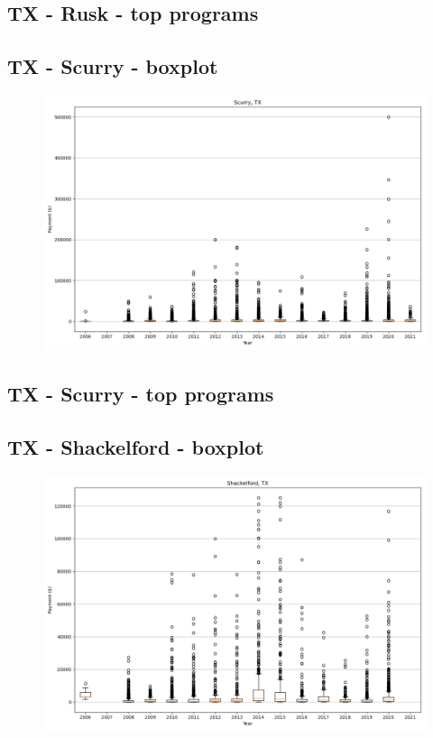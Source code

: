 \subsection*{TX - Rusk - top programs}

\newpage
\subsection*{TX - Scurry - boxplot}
\begin{figure}[h]
\centering
\includegraphics[width=7in]{../output/boxplots/counties/Scurry-TX_boxplot.png}
\end{figure}


\subsection*{TX - Scurry - top programs}

\newpage
\subsection*{TX - Shackelford - boxplot}
\begin{figure}[h]
\centering
\includegraphics[width=7in]{../output/boxplots/counties/Shackelford-TX_boxplot.png}
\end{figure}


